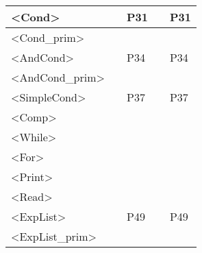 \documentclass[12pt]{article}
\begin{document}
\begin{table}[H]
\begin{tabular}{|l|l|l|l|l|}
		\textless{}Cond\textgreater{}            &                & P31          &               & P31           \\ \hline
		\textless{}Cond\_prim\textgreater{}      &                &              &               &               \\ \hline
		\textless{}AndCond\textgreater{}         &                & P34          &               & P34           \\ \hline
		\textless{}AndCond\_prim\textgreater{}   &                &              &               &               \\ \hline
		\textless{}SimpleCond\textgreater{}      &                & P37          &               & P37           \\ \hline
		\textless{}Comp\textgreater{}            &                &              &               &               \\ \hline
		\textless{}While\textgreater{}           &                &              &               &               \\ \hline
		\textless{}For\textgreater{}             &                &              &               &               \\ \hline
		\textless{}Print\textgreater{}           &                &              &               &               \\ \hline
		\textless{}Read\textgreater{}            &                &              &               &               \\ \hline
		\textless{}ExpList\textgreater{}         &                & P49          &               & P49           \\ \hline
		\textless{}ExpList\_prim\textgreater{}   &                &              &               &               \\ \hline
	\end{tabular}
\end{table}
\end{document}
